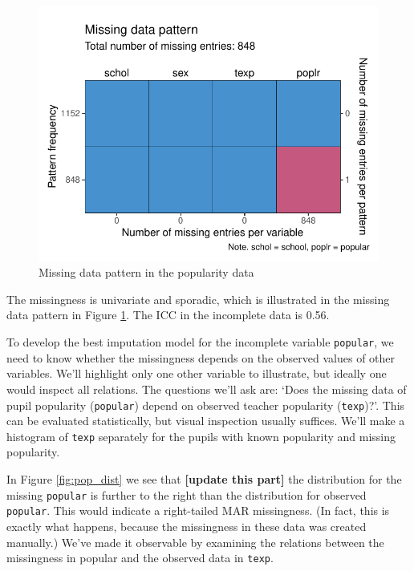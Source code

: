 \documentclass[
]{jss}
\begin{document}
\begin{CodeChunk}
\begin{figure}

{\centering \includegraphics{Imputation_of_Incomplete_Multilevel_Data_files/figure-latex/pop_pat-1} 

}

\caption[Missing data pattern in the popularity data]{Missing data pattern in the popularity data}\label{fig:pop_pat}
\end{figure}
\end{CodeChunk}

The missingness is univariate and sporadic, which is illustrated in the
missing data pattern in Figure \ref{fig:pop_pat}. The ICC in the
incomplete data is 0.56.

To develop the best imputation model for the incomplete variable
\texttt{popular}, we need to know whether the missingness depends on the
observed values of other variables. We'll highlight only one other
variable to illustrate, but ideally one would inspect all relations. The
questions we'll ask are: `Does the missing data of pupil popularity
(\texttt{popular}) depend on observed teacher popularity
(\texttt{texp})?'. This can be evaluated statistically, but visual
inspection usually suffices. We'll make a histogram of \texttt{texp}
separately for the pupils with known popularity and missing popularity.

In Figure \ref{fig:pop_dist} we see that \textbf{{[}update this part{]}}
the distribution for the missing \texttt{popular} is further to the
right than the distribution for observed \texttt{popular}. This would
indicate a right-tailed MAR missingness. (In fact, this is exactly what
happens, because the missingness in these data was created manually.)
We've made it observable by examining the relations between the
missingness in popular and the observed data in \texttt{texp}.
\end{document}

